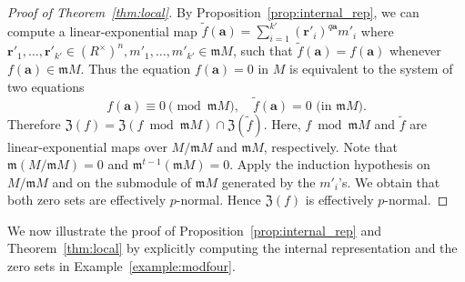 \documentclass[letterpaper, 11pt, thm-restate]{article}
\numberwithin{equation}{section}
\newcommand{\mZ}{\mathfrak{Z}}
\newcommand{\ba}{\boldsymbol{a}}
\newcommand{\br}{\boldsymbol{r}}
\newcommand{\frm}{\mathfrak{m}}
\theoremstyle{definition}
\theoremstyle{definition}
\theoremstyle{definition}
\begin{document}
\begin{proof}[Proof of Theorem~\ref{thm:local}]
    By Proposition~\ref{prop:internal_rep}, we can compute a linear-exponential map $\tilde f(\ba) = \sum_{i = 1}^{k'} (\br'_i)^{q\ba} m'_i$ where $\br'_1, \ldots, \br'_{k'}\in (R^{\times})^n, m'_1, \ldots, m'_{k'}\in \frm M$, such that $\tilde f(\ba)=f(\ba)$ whenever $f(\ba) \in \frm M$.
    Thus the equation $f(\ba) = 0$ in $M$ is equivalent to the system of two equations
    \[
    f(\ba) \equiv 0 \pmod{\frm M}, \quad \tilde f(\ba) = 0 \text{ (in $\frm M$).}
    \]
    Therefore $\mZ(f) = \mZ(f \bmod \frm M) \cap \mZ(\tilde f)$.
    Here, $f \bmod \frm M$ and $\tilde f$ are linear-exponential maps over $M/\frm M$ and $\frm M$, respectively.
    Note that $\frm (M/\frm M) = 0$ and $\frm^{t-1}(\frm M) = 0$.
    Apply the induction hypothesis on $M/\frm M$ and on the submodule of $\frm M$ generated by the $m'_i$'s.
    We obtain that both zero sets are effectively $p$-normal.
    Hence $\mZ(f)$ is effectively $p$-normal.
\end{proof}

We now illustrate the proof of Proposition~\ref{prop:internal_rep} and Theorem~\ref{thm:local} by explicitly computing the internal representation and the zero sets in Example~\ref{example:modfour}.
\end{document}
